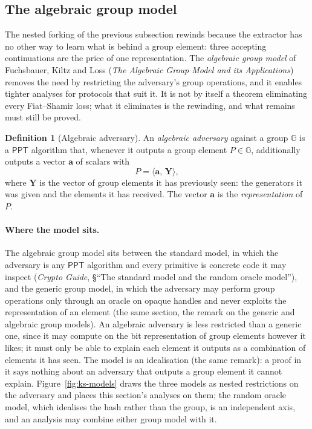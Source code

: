 \documentclass[11pt,a4paper]{article}
\theoremstyle{definition}
\newtheorem{definition}[theorem]{Definition}
\newcommand{\G}{\mathbb{G}}
\newcommand{\ip}[2]{\langle #1,\, #2 \rangle}
\newcommand{\PPT}{\mathsf{PPT}}
\begin{document}
\subsection{The algebraic group model}
\label{sec:ks-agm}

The nested forking of the previous subsection rewinds because the
extractor has no other way to learn what is behind a group element:
three accepting continuations are the price of one representation. The
\emph{algebraic group model} of Fuchsbauer, Kiltz and Loss (\emph{The
Algebraic Group Model and its Applications}) removes the
need by restricting the adversary's group operations, and it enables
tighter analyses for protocols that suit it. It is not by itself a
theorem eliminating every Fiat--Shamir loss; what it eliminates is the
rewinding, and what remains must still be proved.

\begin{definition}[Algebraic adversary]\label{def:ks-algebraic}
An \emph{algebraic adversary} against a group $\G$ is a $\PPT$
algorithm that, whenever it outputs a group element $P \in \G$,
additionally outputs a vector $\mathbf a$ of scalars with
\[
P = \ip{\mathbf a}{\mathbf Y},
\]
where $\mathbf Y$ is the vector of group elements it has previously
seen: the generators it was given and the elements it has received. The
vector $\mathbf a$ is the \emph{representation} of $P$.
\end{definition}

\paragraph{Where the model sits.}
The algebraic group model sits between the standard model, in which the
adversary is any $\PPT$ algorithm and every primitive is concrete code
it may inspect (\emph{Crypto Guide}, \S``The standard model and the
random oracle model''), and the generic group model, in which the
adversary may perform group operations only through an oracle on opaque
handles and never exploits the representation of an element (the same
section, the remark on the generic and algebraic group models). An
algebraic adversary is less restricted than a generic one, since it may
compute on the bit representation of group elements however it likes;
it must only be able to explain each element it outputs as a
combination of elements it has seen. The model is an idealisation (the
same remark): a proof in it says nothing about an adversary that
outputs a group element it cannot explain. Figure~\ref{fig:ks-models}
draws the three models as nested restrictions on the adversary and
places this section's analyses on them; the random oracle model, which
idealises the hash rather than the group, is an independent axis, and an
analysis may combine either group model with it.
\end{document}
